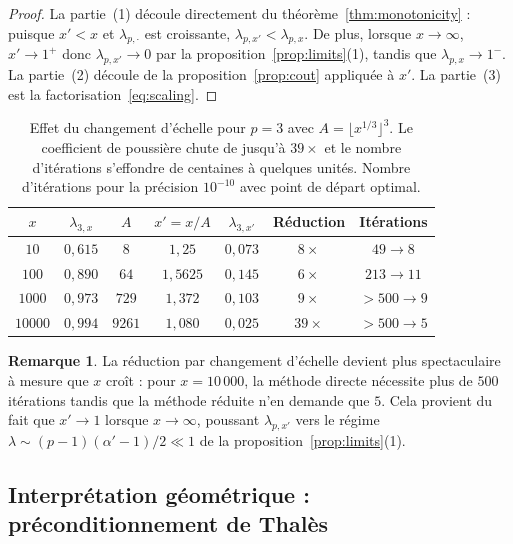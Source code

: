 \documentclass[11pt,a4paper]{article}
\theoremstyle{definition}
\newtheorem{remark}{Remarque}[section]
\begin{document}
\begin{proof}
La partie~(1) découle directement du théorème~\ref{thm:monotonicity} : puisque $x' < x$ et $\lambda_{p,\cdot}$ est croissante, $\lambda_{p,x'} < \lambda_{p,x}$. De plus, lorsque $x \to \infty$, $x' \to 1^+$ donc $\lambda_{p,x'} \to 0$ par la proposition~\ref{prop:limits}(1), tandis que $\lambda_{p,x} \to 1^-$. La partie~(2) découle de la proposition~\ref{prop:cout} appliquée à $x'$. La partie~(3) est la factorisation~\eqref{eq:scaling}.
\end{proof}

\begin{table}[h]
\centering
\begin{tabular}{ccccccc}
\toprule
$x$ & $\lambda_{3,x}$ & $A$ & $x' = x/A$ & $\lambda_{3,x'}$ & Réduction & Itérations \\
\midrule
$10$ & $0{,}615$ & $8$ & $1{,}25$ & $0{,}073$ & $8\times$ & $49 \to 8$ \\
$100$ & $0{,}890$ & $64$ & $1{,}5625$ & $0{,}145$ & $6\times$ & $213 \to 11$\\
$1000$ & $0{,}973$ & $729$ & $1{,}372$ & $0{,}103$ & $9\times$ & $>500 \to 9$ \\
$10000$ & $0{,}994$ & $9261$ & $1{,}080$ & $0{,}025$ & $39\times$ & $>500 \to 5$ \\
\bottomrule
\end{tabular}
\caption{Effet du changement d'échelle pour $p = 3$ avec $A = \lfloor x^{1/3} \rfloor^3$. Le coefficient de poussière chute de jusqu'à $39\times$ et le nombre d'itérations s'effondre de centaines à quelques unités. Nombre d'itérations pour la précision $10^{-10}$ avec point de départ optimal.}
\end{table}

\begin{remark}
La réduction par changement d'échelle devient plus spectaculaire à mesure que $x$ croît : pour $x = 10\,000$, la méthode directe nécessite plus de $500$ itérations tandis que la méthode réduite n'en demande que $5$. Cela provient du fait que $x' \to 1$ lorsque $x \to \infty$, poussant $\lambda_{p,x'}$ vers le régime $\lambda \sim (p-1)(\alpha'-1)/2 \ll 1$ de la proposition~\ref{prop:limits}(1).
\end{remark}

\subsection{Interprétation géométrique : préconditionnement de Thalès}
\label{subsec:thales_preconditioning}
\end{document}
